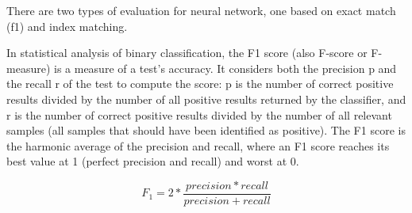 There are two types of evaluation for neural network, one based on exact match (f1) and index matching.

In statistical analysis of binary classification, the F1 score (also F-score or F-measure) is a measure of a test's accuracy. It considers both the precision p and the recall r of the test to compute the score: p is the number of correct positive results divided by the number of all positive results returned by the classifier, and r is the number of correct positive results divided by the number of all relevant samples (all samples that should have been identified as positive). The F1 score is the harmonic average of the precision and recall, where an F1 score reaches its best value at 1 (perfect precision and recall) and worst at 0.

\begin{equation*}
     F_1=2 * \frac {precision * recall} {precision + recall}
\end{equation*}

